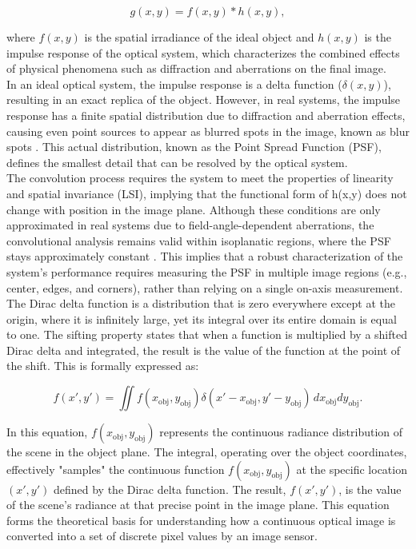 \begin{equation} g(x,y) = f(x,y) * h(x,y), \end{equation}

\noindent where $f(x,y)$ is the spatial irradiance of the ideal object and $h(x,y)$ is the impulse response of the optical system, which characterizes the combined effects of physical phenomena such as diffraction and aberrations on the final image.\\

\noindent In an ideal optical system, the impulse response is a delta function ($\delta(x,y)$), resulting in an exact replica of the object. However, in real systems, the impulse response has a finite spatial distribution due to diffraction and aberration effects, causing even point sources to appear as blurred spots in the image, known as blur spots \cite{Boreman2001ModulationTT52}. This actual distribution, known as the Point Spread Function (PSF), defines the smallest detail that can be resolved by the optical system.\\

\noindent The convolution process requires the system to meet the properties of linearity and spatial invariance (LSI), implying that the functional form of h(x,y) does not change with position in the image plane. Although these conditions are only approximated in real systems due to field-angle-dependent aberrations, the convolutional analysis remains valid within isoplanatic regions, where the PSF stays approximately constant \cite{Boreman2001ModulationTT52}. This implies that a robust characterization of the system's performance requires measuring the PSF in multiple image regions (e.g., center, edges, and corners), rather than relying on a single on-axis measurement.\\

\noindent The Dirac delta function is a distribution that is zero everywhere except at the origin, where it is infinitely large, yet its integral over its entire domain is equal to one. The sifting property states that when a function is multiplied by a shifted Dirac delta and integrated, the result is the value of the function at the point of the shift. This is formally expressed as:

\begin{equation}
f(x',y') = \iint f(x_{\text{obj}},y_{\text{obj}}) \delta(x'-x_{\text{obj}}, y'-y_{\text{obj}})\,dx_{\text{obj}}dy_{\text{obj}}.
\end{equation}

\noindent In this equation, $f(x_{\text{obj}}, y_{\text{obj}})$ represents the continuous radiance distribution of the scene in the object plane. The integral, operating over the object coordinates, effectively "samples" the continuous function $f(x_{\text{obj}}, y_{\text{obj}})$ at the specific location $(x', y')$ defined by the Dirac delta function. The result, $f(x',y')$, is the value of the scene's radiance at that precise point in the image plane. This equation forms the theoretical basis for understanding how a continuous optical image is converted into a set of discrete pixel values by an image sensor.\\

